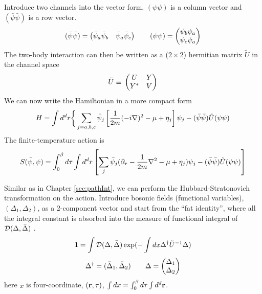 Introduce two channels into the vector form.    $(\psi\psi)$  is a column vector and $(\bar\psi\bar\psi)$ is a row vector.
\begin{equation*}
(\bar\psi\bar\psi)=\begin{pmatrix}\bar\psi_{a}\bar\psi_{b}&\bar\psi_{a}\bar\psi_{c}\end{pmatrix}
\qquad(\psi\psi)=\begin{pmatrix}\psi_{b}\psi_{a}\\\psi_{c}\psi_{a}\end{pmatrix}
\end{equation*}
The two-body interaction can then be written as a ($2\times2$)  hermitian  matrix  $\tilde{U}$ in the channel space
\begin{equation}
\tilde{U}\equiv{}\begin{pmatrix}U&Y\\Y^{*}&V\end{pmatrix}
\end{equation}
We can now write the Hamiltonian in a more compact form
\begin{equation}
H=\int{d^{d}r}\bigg\{\sum_{j={a,b,c}}\bar\psi_{j}\left[\frac{1}{2m}(-i\nabla)^{2}-\mu+\eta_{j}\right]\psi_{j}
 	-(\bar\psi\bar\psi)\tilde{U}(\psi\psi)
\end{equation}
The finite-temperature action is 
\begin{equation}\label{eq:pathInt2:actionFermi}
S(\bar\psi,\psi)=\int^{\beta}_{0}d\tau\int{d^{d}r}\left[\sum_{j}\bar\psi_{j}(\partial_\tau-\frac{1}{2m}\nabla^{2}-\mu+\eta_{j})\psi_{j}
-(\bar\psi\bar\psi)\tilde{U}(\psi\psi)\right]
\end{equation}



Similar as in Chapter \ref{sec:pathInt}, we can perform the Hubbard-Stratonovich transformation on the action.   Introduce bosonic fields (functional variables), $(\Delta_{1},\Delta_{2})$, as a 2-component vector   and start from the ``fat identity'', where  all the integral constant is absorbed into the measure of functional integral of $\mathcal{D}(\Delta,\bar\Delta)$ \cite{Altland}.
\begin{equation}\label{eq:pathInt2:identity}
1=\int{\ensuremath{\mathcal{D}}(\Delta,\bar\Delta)}\exp(-\int{dx}\Delta^{\dagger}\tilde{U}^{-1}\Delta)
\end{equation}
\[
\Delta^{\dagger}=(\bar\Delta_{1},\bar\Delta_{2})\qquad\Delta=\begin{pmatrix}\Delta_{1}\\\Delta_{2}\end{pmatrix}
\]
here $x$ is four-coordinate, $(\mathbf{r}, \tau)$,  $\int{dx}=\int^{\beta}_{0}d\tau\int{d^{d}\ensuremath{\mathbf{r}}}$. 


